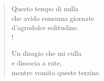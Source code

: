 
\begin{verse}
Questo tempo di nulla\\
che avido consuma giornate\\
d'agrodolce solitudine.\\!

Un disagio che mi culla\\
e dissocia a rate,\\
mentre vomito queste terzine.
\end{verse}
